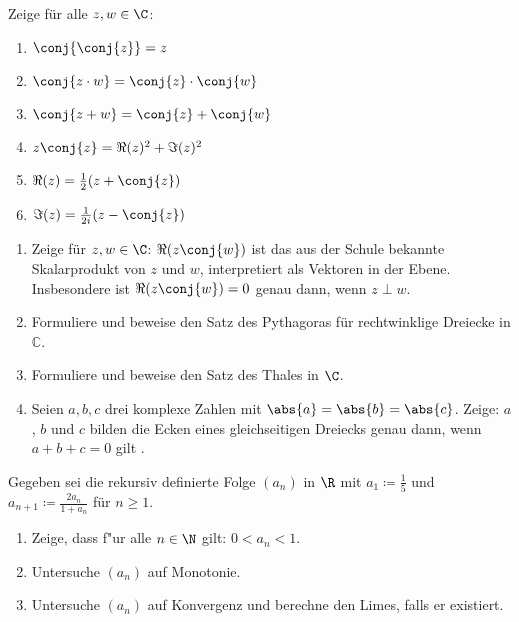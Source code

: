 \begin{prob}
  Zeige für alle  $z,w \in \C$:
  \begin{enumerate}[label=(\alph*)]
  \item $\conj{\conj{z}} = z$
  \item $\conj{z \cdot w} = \conj{z} \cdot \conj{w}$
  \item $\conj{z+w} = \conj{z} + \conj{w}$
  \item $z\conj{z} = \Re(z)^2 + \Im(z)^2$
  \item $\Re(z) = \frac{1}{2} (z + \conj{z})$
  \item $\Im(z) = \frac{1}{2i} (z - \conj{z})$
  \end{enumerate}
\end{prob}

\newpage

\begin{prob}
  \begin{enumerate}[label=(\alph*)]
  \item Zeige für $z, w \in \C$: $\Re(z\conj{w})$ ist das aus der Schule
    bekannte Skalarprodukt von $z$ und $w$, interpretiert als Vektoren in der
    Ebene. Insbesondere ist $\Re(z\conj{w}) = 0$ genau dann, wenn $z \perp w$.
  \item Formuliere und beweise den Satz des Pythagoras für rechtwinklige
    Dreiecke in $\mathbb{C}$.
  \item Formuliere und beweise den Satz des Thales in $\C$.
  \item Seien $a, b, c$ drei komplexe Zahlen mit $\abs{a} = \abs{b} = \abs{c}$.
    Zeige: $a$, $b$ und $c$ bilden die Ecken eines gleichseitigen Dreiecks genau
    dann, wenn $a+b+c = 0$ gilt .
  \end{enumerate}
\end{prob}

\begin{prob}[Bonusaufgabe]
  Gegeben sei die rekursiv definierte Folge $(a_n)$ in $\R$ mit
  $a_1 \coloneqq \frac{1}{5}$ und $a_{n+1} \coloneqq \frac{2a_n}{1 + a_n}$ für $n \geq 1$.
  \begin{enumerate}[label=(\alph*)]
  \item Zeige, dass f"ur alle $n \in \N$ gilt: $0<a_n<1$.
  \item Untersuche $(a_n)$ auf Monotonie.
  \item Untersuche $(a_n)$ auf Konvergenz und berechne den Limes, falls er
    existiert.
  \end{enumerate}
\end{prob}
